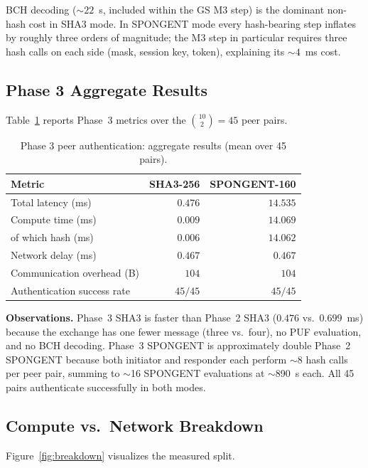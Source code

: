 \documentclass[journal,a4paper,10pt]{IEEEtran}
\begin{document}
BCH decoding ($\sim 22$~\textmu s, included within the GS M3 step) is
the dominant non-hash cost in SHA3 mode. In SPONGENT mode every
hash-bearing step inflates by roughly three orders of magnitude; the
M3 step in particular requires three hash calls on each side (mask,
session key, token), explaining its $\sim 4$~ms cost.

\subsection{Phase 3 Aggregate Results}
Table~\ref{tab:phase3_full} reports Phase~3 metrics over the
$\binom{10}{2}=45$ peer pairs.

\begin{table}[t]
\centering
\caption{Phase 3 peer authentication: aggregate results
(mean over 45 pairs).}
\label{tab:phase3_full}
\begin{tabular}{@{}lrr@{}}
\toprule
\textbf{Metric} & \textbf{SHA3-256} & \textbf{SPONGENT-160} \\
\midrule
Total latency (ms)           & $0.476$ & $14.535$ \\
Compute time (ms)            & $0.009$ & $14.069$ \\
\quad of which hash (ms)     & $0.006$ & $14.062$ \\
Network delay (ms)           & $0.467$ & $0.467$ \\
Communication overhead (B)   & $104$   & $104$ \\
Authentication success rate  & $45/45$ & $45/45$ \\
\bottomrule
\end{tabular}
\end{table}

\textbf{Observations.} Phase~3 SHA3 is faster than Phase~2 SHA3
($0.476$ vs.\ $0.699$~ms) because the exchange has one fewer message
(three vs.\ four), no PUF evaluation, and no BCH decoding. Phase~3
SPONGENT is approximately double Phase~2 SPONGENT because both
initiator and responder each perform $\sim$8 hash calls per peer
pair, summing to $\sim$16 SPONGENT evaluations at $\sim$890~\textmu s
each. All 45 pairs authenticate successfully in both modes.

\subsection{Compute vs.\ Network Breakdown}
Figure~\ref{fig:breakdown} visualizes the measured split.
\end{document}
